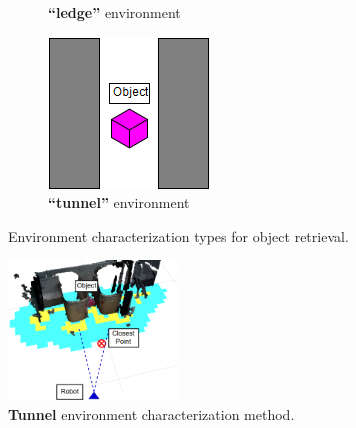 \documentclass[conference]{IEEEtran}
\begin{document}
\begin{figure}[t]
\begin{subfigure}[t]{0.15\textwidth}
        \caption{\textbf{``ledge''} environment}
    \end{subfigure}
        \begin{subfigure}[t]{0.15\textwidth}
        \includegraphics[width=\textwidth]{images/tunnel.png}
        \caption{\textbf{``tunnel''} environment}
    \end{subfigure}
      \caption{Environment characterization types for object retrieval.}
      \label{fig:characters}
   \end{figure}
%
\begin{figure}
\begin{center}
\includegraphics[width=0.4\textwidth]{images/characterization.png}
\caption{\textbf{Tunnel} environment characterization method.}
\label{fig:characterization}
\end{center}
\end{figure}
\end{document}
